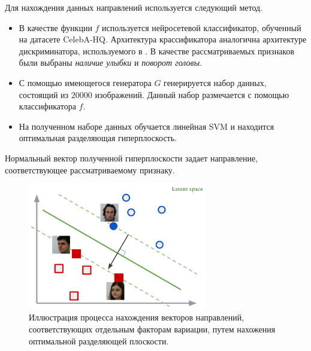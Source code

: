 Для нахождения данных направлений используется следующий метод.
\begin{itemize}
    \item В качестве функции $f$ используется нейросетевой классификатор, обученный на датасете CelebA-HQ. Архитектура крассификатора аналогична архитектуре дискриминатора, используемого в \cite{progressive-growing-gan, StyleGAN}. В качестве рассматриваемых признаков были выбраны \emph{наличие улыбки} и \emph{поворот головы}.
    \item С помощью имеющегося генератора $G$ генерируется набор данных, состоящий из $20000$ изображений. Данный набор размечается с помощью классификатора $f$.
    \item На полученном наборе данных обучается линейная SVM \cite{svm} и находится оптимальная разделяющая гиперплоскость. 
\end{itemize}
Нормальный вектор полученной гиперплоскости задает направление, соответствующее рассматриваемому признаку.

\begin{figure}[h]
\begin{center}
    \includegraphics[width=0.7\textwidth]{boundary-SVM}
    \caption{Иллюстрация процесса нахождения векторов направлений, соответствующих отдельным факторам вариации, путем нахожения оптимальной разделяющей плоскости.}
    \label{fig:svm-boundary}
\end{center}
\end{figure}

